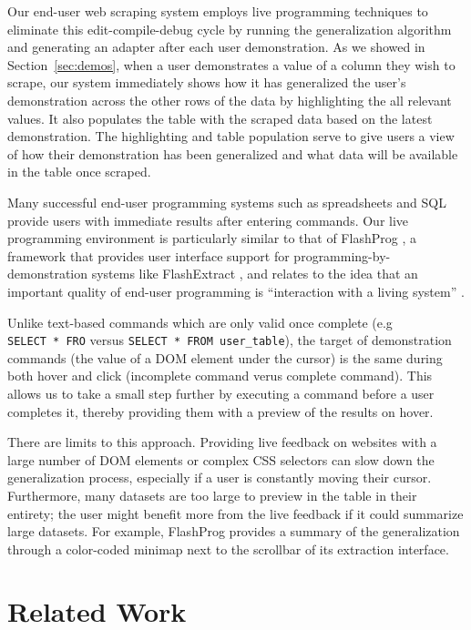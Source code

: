 \documentclass[sigconf,10pt]{acmart}
\begin{document}
Our end-user web scraping system employs live programming techniques to
eliminate this edit-compile-debug cycle by running the generalization
algorithm and generating an adapter after each user demonstration. As we
showed in Section~\ref{sec:demos}, when a user demonstrates a value of a
column they wish to scrape, our system immediately shows how it has
generalized the user's demonstration across the other rows of the data
by highlighting the all relevant values. It also populates the table
with the scraped data based on the latest demonstration. The
highlighting and table population serve to give users a view of how
their demonstration has been generalized and what data will be available
in the table once scraped.

Many successful end-user programming systems such as spreadsheets and
SQL provide users with immediate results after entering commands. Our
live programming environment is particularly similar to that of
FlashProg \citep{mayer2015}, a framework that provides user interface
support for programming-by-demonstration systems like FlashExtract
\citep{le2014}, and relates to the idea that an important quality of
end-user programming is ``interaction with a living system''
\citep{zotero-60}.

Unlike text-based commands which are only valid once complete (e.g
\texttt{SELECT\ *\ FRO} versus \texttt{SELECT\ *\ FROM\ user\_table}),
the target of demonstration commands (the value of a DOM element under
the cursor) is the same during both hover and click (incomplete command
verus complete command). This allows us to take a small step further by
executing a command before a user completes it, thereby providing them
with a preview of the results on hover.

There are limits to this approach. Providing live feedback on websites
with a large number of DOM elements or complex CSS selectors can slow
down the generalization process, especially if a user is constantly
moving their cursor. Furthermore, many datasets are too large to preview
in the table in their entirety; the user might benefit more from the
live feedback if it could summarize large datasets. For example,
FlashProg provides a summary of the generalization through a color-coded
minimap next to the scrollbar of its extraction interface.

\hypertarget{sec:related-work}{%
\section{Related Work}\label{sec:related-work}}
\end{document}
